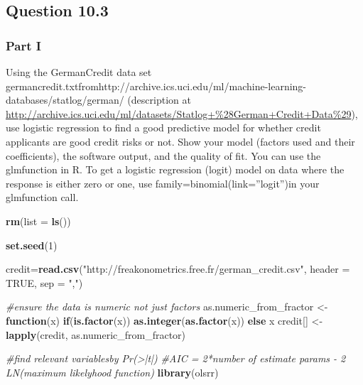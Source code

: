 \documentclass[]{article}
\newenvironment{Shaded}{\begin{snugshade}}{\end{snugshade}}
\newcommand{\CommentTok}[1]{\textcolor[rgb]{0.56,0.35,0.01}{\textit{#1}}}
\newcommand{\ControlFlowTok}[1]{\textcolor[rgb]{0.13,0.29,0.53}{\textbf{#1}}}
\newcommand{\DataTypeTok}[1]{\textcolor[rgb]{0.13,0.29,0.53}{#1}}
\newcommand{\DecValTok}[1]{\textcolor[rgb]{0.00,0.00,0.81}{#1}}
\newcommand{\KeywordTok}[1]{\textcolor[rgb]{0.13,0.29,0.53}{\textbf{#1}}}
\newcommand{\NormalTok}[1]{#1}
\newcommand{\OtherTok}[1]{\textcolor[rgb]{0.56,0.35,0.01}{#1}}
\newcommand{\StringTok}[1]{\textcolor[rgb]{0.31,0.60,0.02}{#1}}
\begin{document}
\hypertarget{question-10.3}{%
\subsection{Question 10.3}\label{question-10.3}}

\hypertarget{part-i}{%
\subsubsection{Part I}\label{part-i}}

Using the GermanCredit data set
germancredit.txtfromhttp://archive.ics.uci.edu/ml/machine-learning-databases/statlog/german/
(description at
\url{http://archive.ics.uci.edu/ml/datasets/Statlog+\%28German+Credit+Data\%29}),
use logistic regression to find a good predictive model for whether
credit applicants are good credit risks or not. Show your model (factors
used and their coefficients), the software output, and the quality of
fit. You can use the glmfunction in R. To get a logistic regression
(logit) model on data where the response is either zero or one, use
family=binomial(link=''logit'')in your glmfunction call.

\begin{Shaded}
\begin{Highlighting}[]
\KeywordTok{rm}\NormalTok{(}\DataTypeTok{list =} \KeywordTok{ls}\NormalTok{())}

\KeywordTok{set.seed}\NormalTok{(}\DecValTok{1}\NormalTok{)}

\NormalTok{credit=}\KeywordTok{read.csv}\NormalTok{(}\StringTok{"http://freakonometrics.free.fr/german_credit.csv"}\NormalTok{, }\DataTypeTok{header =} \OtherTok{TRUE}\NormalTok{, }\DataTypeTok{sep =} \StringTok{","}\NormalTok{)}

\CommentTok{#ensure the data is numeric not just factors}
\NormalTok{as.numeric_from_fractor <-}\StringTok{ }\ControlFlowTok{function}\NormalTok{(x) }\ControlFlowTok{if}\NormalTok{(}\KeywordTok{is.factor}\NormalTok{(x)) }\KeywordTok{as.integer}\NormalTok{(}\KeywordTok{as.factor}\NormalTok{(x)) }\ControlFlowTok{else}\NormalTok{ x}
\NormalTok{credit[] <-}\StringTok{ }\KeywordTok{lapply}\NormalTok{(credit, as.numeric_from_fractor)}

\CommentTok{#find relevant variablesby Pr(>|t|)}
\CommentTok{#AIC = 2*number of estimate params - 2 LN(maximum likelyhood function)}
\KeywordTok{library}\NormalTok{(olsrr)}
\end{Highlighting}
\end{Shaded}
\end{document}
